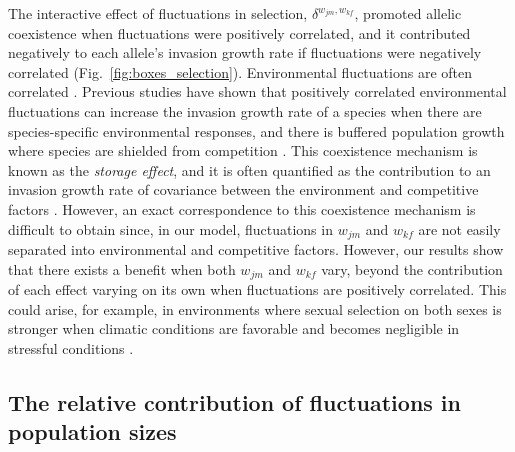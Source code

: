 \documentclass[12pt]{article}
\begin{document}
 The interactive effect of fluctuations in selection, $\delta^{w_{jm},w_{kf}}$, promoted allelic coexistence when fluctuations were positively correlated, and it contributed negatively to each allele's invasion growth rate if fluctuations were negatively correlated (Fig.~\ref{fig:boxes_selection}). Environmental fluctuations are often correlated \citep{steele1985comparison}. Previous studies have shown that positively correlated environmental fluctuations can increase the invasion growth rate of a species when there are species-specific environmental responses, and there is buffered population growth where species are shielded from competition \citep{schreiber2021positively}. This coexistence mechanism is known as the \textit{storage effect}, and it is often quantified as the contribution to an invasion growth rate of covariance between the environment and competitive factors \citep{ellner2016quantify}. However, an exact correspondence to this coexistence mechanism is difficult to obtain since, in our model, fluctuations in $w_{jm}$ and $w_{kf}$ are not easily separated into environmental and competitive factors. However, our results show that there exists a benefit when both $w_{jm}$ and $w_{kf}$ vary, beyond the contribution of each effect varying on its own when fluctuations are positively correlated. This could arise, for example, in environments where sexual selection on both sexes is stronger when climatic conditions are favorable and becomes negligible in stressful conditions \citep{cockburn2008swingin}.




 \subsection*{The relative contribution of fluctuations in population sizes}
\end{document}

